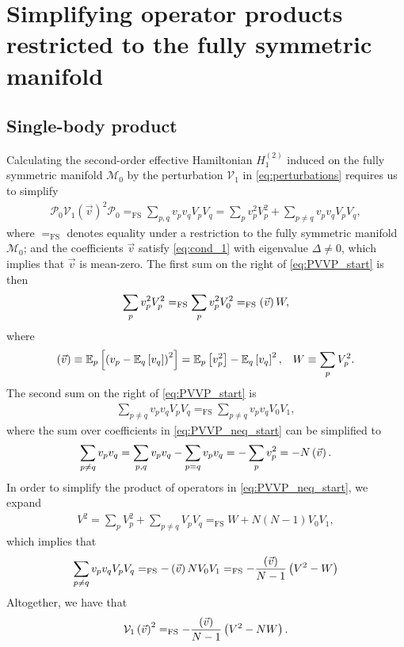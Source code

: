 \documentclass[nofootinbib,notitlepage,11pt]{revtex4-2}
\newcommand{\f}[2]{\dfrac{#1}{#2}} %
\newcommand{\p}[1]{\left(#1\right)} %
\renewcommand{\sp}[1]{\left[#1\right]} %
\renewcommand{\v}{\vec} %
\newcommand{\1}{\mathds{1}}
\newcommand{\M}{\mathcal{M}}
\renewcommand{\P}{\mathcal{P}}
\newcommand{\V}{\mathcal{V}}
\newcommand{\EE}{\mathbb{E}}
\newcommand{\FSEQ}{=_{\text{FS}}}
\let\var\relax
\DeclareMathOperator{\var}{var}
\begin{document}
\section{Simplifying operator products restricted to the fully
  symmetric manifold}
\label{sec:sym_prod}

\subsection{Single-body product}
\label{sec:PVVP}

Calculating the second-order effective Hamiltonian $H_1^{(2)}$ induced
on the fully symmetric manifold $\M_0$ by the perturbation $\V_1$ in
\eqref{eq:perturbations} requires us to simplify
\begin{align}
  \P_0 \V_1\p{\v v}^2 \P_0
  \FSEQ \sum_{p,q} v_p v_q V_p V_q
  = \sum_p v_p^2 V_p^2
  + \sum_{p\ne q} v_p v_q V_p V_q,
  \label{eq:PVVP_start}
\end{align}
where $\FSEQ$ denotes equality under a restriction to the fully
symmetric manifold $\M_0$; and the coefficients $\v v$ satisfy
\eqref{eq:cond_1} with eigenvalue $\Delta\ne0$, which implies that
$\v v$ is mean-zero.  The first sum on the right of
\eqref{eq:PVVP_start} is then
\begin{align}
  \sum_p v_p^2 V_p^2
  \FSEQ \sum_p v_p^2 V_0^2
  \FSEQ \var\p{\v v} W,
  \label{eq:PVVP_eq}
\end{align}
where
\begin{align}
  \var\p{\v v} \equiv \EE_p\sp{\p{v_p-\EE_q\sp{v_q}}^2}
  = \EE_p\sp{v_p^2} - \EE_q\sp{v_q}^2,
  &&
  W \equiv \sum_p V_p^2.
\end{align}
The second sum on the right of \eqref{eq:PVVP_start} is
\begin{align}
  \sum_{p\ne q} v_p v_q V_p V_q
  \FSEQ \sum_{p\ne q} v_p v_q V_0 V_1,
  \label{eq:PVVP_neq_start}
\end{align}
where the sum over coefficients in \eqref{eq:PVVP_neq_start} can be
simplified to
\begin{align}
  \sum_{p\ne q} v_p v_q
  = \sum_{p,q} v_p v_q - \sum_{p=q} v_p v_q
  = - \sum_p v_p^2 = - N \var\p{\v v}.
\end{align}
In order to simplify the product of operators in
\eqref{eq:PVVP_neq_start}, we expand
\begin{align}
  V^2
  = \sum_p V_p^2
  + \sum_{p\ne q} V_p V_q
  \FSEQ W + N \p{N-1} V_0 V_1,
  \label{eq:PVVP_neq_ops}
\end{align}
which implies that
\begin{align}
  \sum_{p\ne q} v_p v_q V_p V_q
  \FSEQ - \var\p{\v v} N V_0 V_1
  \FSEQ -\f{\var\p{\v v}}{N-1} \p{V^2 - W}
  \label{eq:PVVP_neq}
\end{align}
Altogether, we have that
\begin{align}
  \V_1\p{\v v}^2
  \FSEQ -\f{\var\p{\v v}}{N-1} \p{V^2 - N W}.
\end{align}
\end{document}
